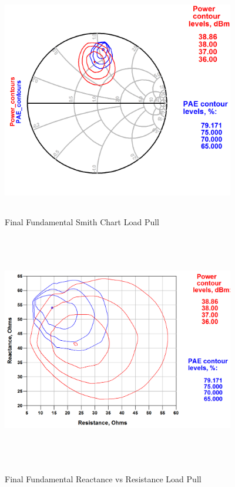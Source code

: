 \begin{figure}
  \centering
  \includegraphics[width=4in,height=4in,keepaspectratio]{figures/simulation/sc_fund_final_load}\\
  \caption{Final Fundamental Smith Chart Load Pull}
  \label{fig:sc_fund_final_load}

  \vspace*{\floatsep}

  \centering
  \includegraphics[width=4in,height=4in,keepaspectratio]{figures/simulation/res_cont_fund_load_final}\\
  \caption{Final Fundamental Reactance vs Resistance Load Pull}
  \label{fig:res_cont_fund_load_final}
\end{figure}

